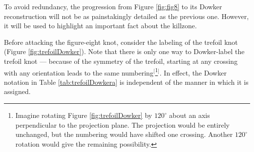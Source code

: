 \documentclass[titlepage]{article}
\begin{document}
\noindent To avoid redundancy, the progression from Figure \ref{fig:fig8} to its Dowker reconstruction will not be as painstakingly detailed as the previous one. However, it will be used to highlight an important fact about the killzone.\par
Before attacking the figure-eight knot, consider the labeling of the trefoil knot (Figure \ref{fig:trefoilDowker}). Note that there is only one way to Dowker-label the trefoil knot --- because of the symmetry of the trefoil, starting at any crossing with any orientation leads to the same numbering$^[$\footnote{Imagine rotating Figure \ref{fig:trefoilDowker} by $120^\circ$ about an axis perpendicular to the projection plane. The projection would be entirely unchanged, but the numbering would have shifted one crossing. Another $120^\circ$ rotation would give the remaining possibility.}$^]$. In effect, the Dowker notation in Table \ref{tab:trefoilDowkera} is independent of the manner in which it is assigned.\par
\end{document}
